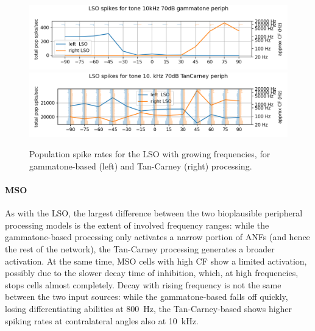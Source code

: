 \documentclass[11pt,a4paper,twocolumn]{article}
\begin{document}
\begin{figure}
    \includegraphics[width=0.4\linewidth]{Images/lso10khz.png}
    \includegraphics[width=0.4\linewidth]{Images/lso10000tc.png}
    \caption{Population spike rates for the LSO with growing frequencies, for gammatone-based (left) and Tan-Carney (right) processing.}
    \label{fig:res-lso}
\end{figure}

\paragraph{MSO}
As with the LSO, the largest difference between the two bioplausible peripheral processing models is the extent of involved frequency ranges: while the gammatone-based processing only activates a narrow portion of ANFs (and hence the rest of the network), the Tan-Carney processing generates a broader activation. At the same time, MSO cells with high CF show a limited activation, possibly due to the slower decay time of inhibition, which, at high frequencies, stops cells almost completely. Decay with rising frequency is not the same between the two input sources: while the gammatone-based falls off quickly, losing differentiating abilities at \qty{800}{\hertz}, the Tan-Carney-based shows higher spiking rates at contralateral angles also at \qty{10}{\kilo\hertz}.
\end{document}
